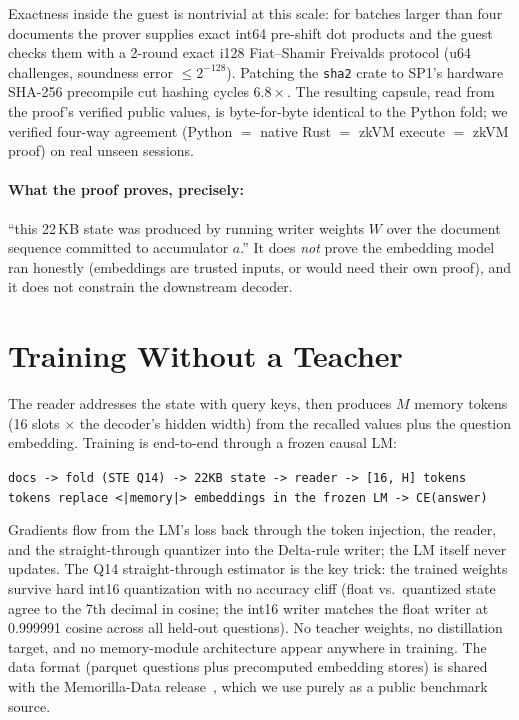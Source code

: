 \documentclass[11pt]{article}
\begin{document}
Exactness inside the guest is nontrivial at this scale: for batches
larger than four documents the prover supplies exact int64 pre-shift
dot products and the guest checks them with a 2-round exact i128
Fiat--Shamir Freivalds protocol (u64 challenges, soundness error
$\le 2^{-128}$). Patching the \texttt{sha2} crate to SP1's hardware
SHA-256 precompile cut hashing cycles $6.8\times$. The resulting
capsule, read from the proof's verified public values, is
byte-for-byte identical to the Python fold; we verified four-way
agreement (Python $=$ native Rust $=$ zkVM execute $=$ zkVM proof) on
real unseen sessions.

\paragraph{What the proof proves, precisely:} ``this 22\,KB state was
produced by running writer weights $W$ over the document sequence
committed to accumulator $a$.'' It does \emph{not} prove the embedding
model ran honestly (embeddings are trusted inputs, or would need their
own proof), and it does not constrain the downstream decoder.

\section{Training Without a Teacher}
\label{sec:training}
The reader addresses the state with query keys, then produces $M$
memory tokens (16 slots $\times$ the decoder's hidden width) from the
recalled values plus the question embedding. Training is end-to-end
through a frozen causal LM:
\begin{center}
\small
\texttt{docs -> fold (STE Q14) -> 22KB state -> reader -> [16, H] tokens}\\
\texttt{tokens replace <|memory|> embeddings in the frozen LM -> CE(answer)}
\end{center}
Gradients flow from the LM's loss back through the token injection,
the reader, and the straight-through quantizer into the Delta-rule
writer; the LM itself never updates. The Q14 straight-through
estimator is the key trick: the trained weights survive hard int16
quantization with no accuracy cliff (float vs.\ quantized state agree
to the 7th decimal in cosine; the int16 writer matches the float
writer at 0.999991 cosine across all held-out questions). No teacher
weights, no distillation target, and no memory-module architecture
appear anywhere in training. The data format (parquet questions plus
precomputed embedding stores) is shared with the Memorilla-Data
release~\cite{memorilla2026}, which we use purely as a public
benchmark source.
\end{document}
